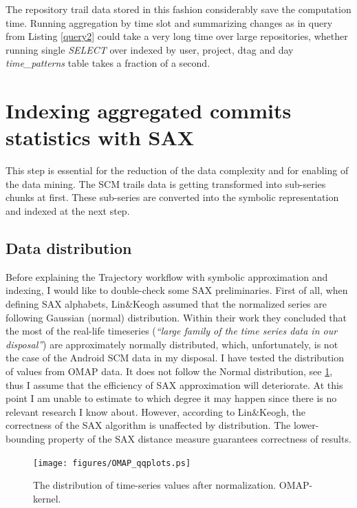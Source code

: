 \documentclass[a4paper,10pt]{article}
\numberwithin{equation}{subsection}
\begin{document}
The repository trail data stored in this fashion considerably save the computation time. Running aggregation by time slot 
and summarizing changes as in query from Listing \ref{query2} could take a very long time over large repositories, whether running 
single \emph{SELECT} over indexed by user, project, dtag and day \emph{time\_patterns} table takes a fraction of a second.

\section{Indexing aggregated commits statistics with SAX}\label{sec:second}
This step is essential for the reduction of the data complexity and for enabling of the data mining. The SCM trails data 
is getting transformed into sub-series chunks at first. These sub-series are converted into the symbolic representation
and indexed at the next step.

\subsection{Data distribution}
Before explaining the Trajectory workflow with symbolic approximation and indexing, I would like to double-check some SAX 
preliminaries.
First of all, when defining SAX alphabets, Lin\&Keogh \cite{citeulike:2821475} assumed that the normalized series are 
following Gaussian (normal) distribution. Within their work they concluded that the most of the real-life timeseries 
(\textit{``large family of the time series data in our disposal''}) are approximately normally distributed, which, 
unfortunately, is not the case of the Android SCM data in my disposal. 
I have tested the distribution of values from OMAP data. It does not follow the Normal distribution, see \ref{fig:qqplots},
thus I assume that the efficiency of SAX approximation will deteriorate. At this point I am unable to estimate to which
degree it may happen since there is no relevant research I know about.
However, according to Lin\&Keogh, the correctness of the SAX algorithm is unaffected by distribution.
The lower-bounding property of the SAX distance measure guarantees correctness of results.

\begin{figure}[p]
   \centering
   \texttt{[image: figures/OMAP\_qqplots.ps]}
   \caption{The distribution of time-series values after normalization. OMAP-kernel.}
   \label{fig:qqplots}
\end{figure}
\end{document}
